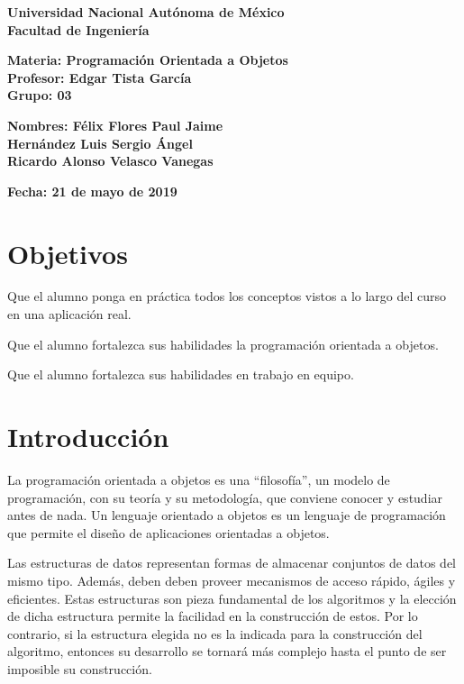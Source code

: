 \documentclass[12pt,a4paper]{report}
\begin{document}
{%
\begin{center}
\par\vspace{2cm} %
{
\Huge\textbf{
Universidad Nacional Autónoma de México \\[2cm] Facultad de Ingeniería
}
}
\par\vspace{1 cm}
{
\Large\textbf{ Materia: Programación Orientada a Objetos \\ Profesor: Edgar Tista García \\ Grupo: 03
}
}
\par\vspace{1cm}
{
\large\textbf{Nombres: Félix Flores Paul Jaime \\ Hernández Luis Sergio Ángel \\ Ricardo Alonso Velasco Vanegas } 
}
\par\vspace{1 cm}
{
\large\textbf{Fecha: 21 de mayo de 2019 } 
}
\par\vspace{3cm}
\end{center}
\clearpage
\section*{Objetivos}

Que el alumno ponga en práctica todos los conceptos vistos a lo largo del curso en una aplicación real.

Que el alumno fortalezca sus habilidades la programación orientada a objetos.

Que el alumno fortalezca sus habilidades en trabajo en equipo.
\section*{Introducción}
La programación orientada a objetos es una “filosofía”, un modelo de programación, con su teoría y su metodología, que conviene conocer y estudiar antes de nada. Un lenguaje orientado a objetos es un lenguaje de programación que permite el diseño de aplicaciones orientadas a objetos.

Las estructuras de datos representan formas de almacenar conjuntos de datos del mismo tipo. Además, deben deben proveer mecanismos de acceso rápido, ágiles y eficientes. Estas estructuras son pieza fundamental de los algoritmos y la elección de dicha estructura permite la facilidad en la construcción de estos. Por lo contrario, si la estructura elegida no es la indicada para la construcción del algoritmo, entonces su desarrollo se tornará más complejo hasta el punto de ser imposible su construcción.

}
\end{document}

